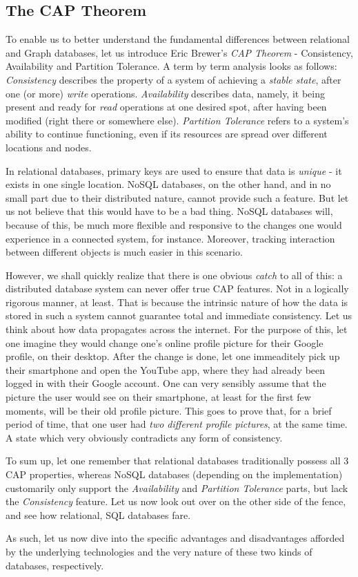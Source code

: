 \documentclass[10pt,        %
               a4paper,     %
               journal,     %
               ]{IEEEtran}
\begin{document}
\subsection{The CAP Theorem}
To enable us to better understand the fundamental differences between relational and Graph databases, let us introduce Eric Brewer's \textit{CAP Theorem} - Consistency, Availability and Partition Tolerance. \cite{brewer_cap_theorem} A term by term analysis looks as follows: \textit{Consistency} describes the property of a system of achieving a \textit{stable state}, after one (or more) \textit{write} operations. \textit{Availability} describes data, namely, it being present and ready for \textit{read} operations at one desired spot, after having been modified (right there or somewhere else). \textit{Partition Tolerance} refers to a system's ability to continue functioning, even if its resources are spread over different locations and nodes. \par
In relational databases, primary keys are used to ensure that data is \textit{unique} - it exists in one single location. NoSQL databases, on the other hand, and in no small part due to their distributed nature, cannot provide such a feature. But let us not believe that this would have to be a bad thing. NoSQL databases will, because of this, be much more flexible and responsive to the changes one would experience in a connected system, for instance. Moreover, tracking interaction between different objects is much easier in this scenario. \par
However, we shall quickly realize that there is one obvious \textit{catch} to all of this: a distributed database system can never offer true CAP features. Not in a logically rigorous manner, at least. That is because the intrinsic nature of how the data is stored in such a system cannot guarantee total and immediate consistency. Let us think about how data propagates across the internet. For the purpose of this, let one imagine they would change one's online profile picture for their Google profile, on their desktop. After the change is done, let one immeaditely pick up their smartphone and open the YouTube app, where they had already been logged in with their Google account. One can very sensibly assume that the picture the user would see on their smartphone, at least for the first few moments, will be their old profile picture. This goes to prove that, for a brief period of time, that one user had \textit{two different profile pictures}, at the same time. A state which very obviously contradicts any form of consistency. \par
To sum up, let one remember that relational databases traditionally possess all 3 CAP properties, whereas NoSQL databases (depending on the implementation) customarily only support the \textit{Availability} and \textit{Partition Tolerance} parts, but lack the \textit{Consistency} feature. Let us now look out over on the other side of the fence, and see how relational, SQL databases fare. \par
As such, let us now dive into the specific advantages and disadvantages afforded by the underlying technologies and the very nature of these two kinds of databases, respectively. 
\end{document}
